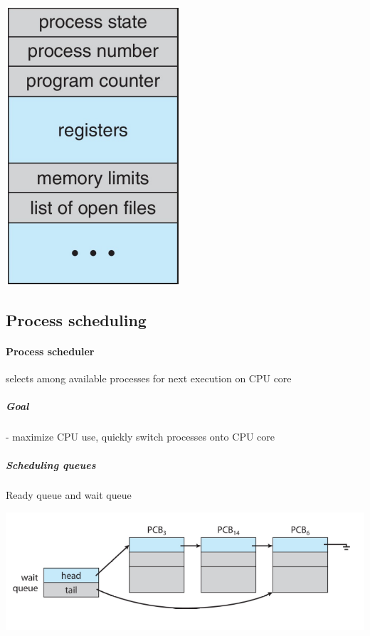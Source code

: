 \documentclass{article}
\begin{document}
\begin{center}
    \includegraphics[scale=0.3]{2_taskcontrolblock.png}
\end{center}

\subsection*{Process scheduling}
\paragraph*{Process scheduler} selects among available processes for next execution on CPU core
\subparagraph*{Goal} - maximize CPU use, quickly switch processes onto CPU core
\subparagraph*{Scheduling queues} Ready queue and wait queue

\begin{center}
    \includegraphics[scale=0.3]{3_processqueue.png}
\end{center}
\end{document}
